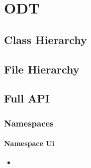 \documentclass[letterpaper,10pt,english]{sphinxmanual}
\begin{document}
\chapter{ODT}
\label{\detokenize{api/library_root:odt}}\label{\detokenize{api/library_root::doc}}

\section{Class Hierarchy}
\label{\detokenize{api/library_root:class-hierarchy}}



\section{File Hierarchy}
\label{\detokenize{api/library_root:file-hierarchy}}



\section{Full API}
\label{\detokenize{api/library_root:full-api}}

\subsection{Namespaces}
\label{\detokenize{api/library_root:namespaces}}
\sphinxstepscope


\subsubsection{Namespace Ui}
\label{\detokenize{api/namespace_Ui:namespace-ui}}\label{\detokenize{api/namespace_Ui:id1}}\label{\detokenize{api/namespace_Ui::doc}}
\begin{sphinxShadowBox}
\begin{itemize}
\item {} 
\sphinxAtStartPar
{}\label{\detokenize{api/namespace_Ui:id2}}{\hyperref[\detokenize{api/namespace_Ui:classes}]{}}

\end{itemize}
\end{sphinxShadowBox}
\end{document}
